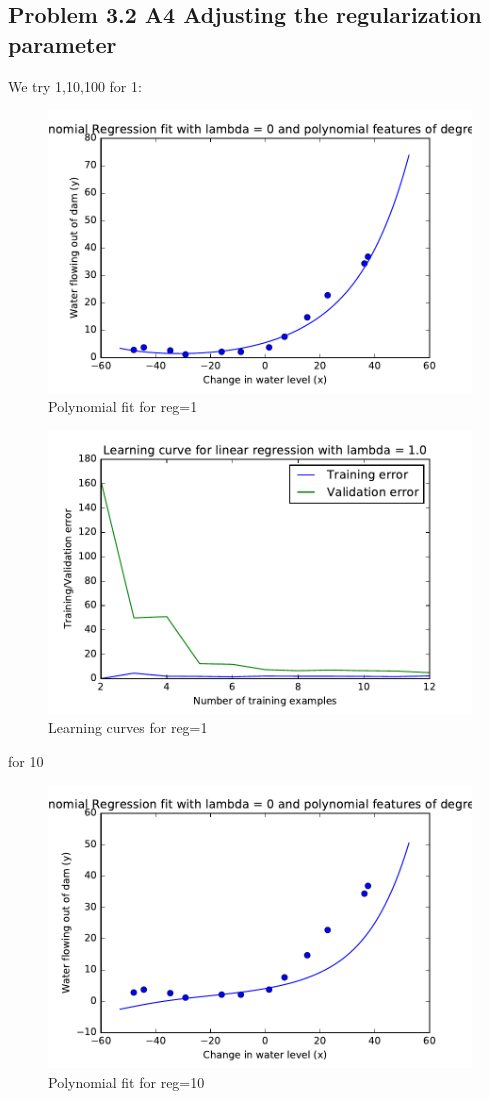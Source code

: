 \documentclass[pdftex,11pt]{article}
\begin{document}
\subsection{Problem 3.2 A4 Adjusting the regularization parameter}
We try  1,10,100
for 1:
\begin{figure}[H]
  \caption{Polynomial fit for reg=1}
  \centering
    \includegraphics[scale=1]{fig91.pdf}
\end{figure}
\begin{figure}[H]
  \caption{Learning curves for reg=1}
  \centering
    \includegraphics[scale=1]{fig101.pdf}
\end{figure}
for 10
\begin{figure}[H]
  \caption{Polynomial fit for reg=10}
  \centering
    \includegraphics[scale=1]{fig910.pdf}
\end{figure}
\end{document}
